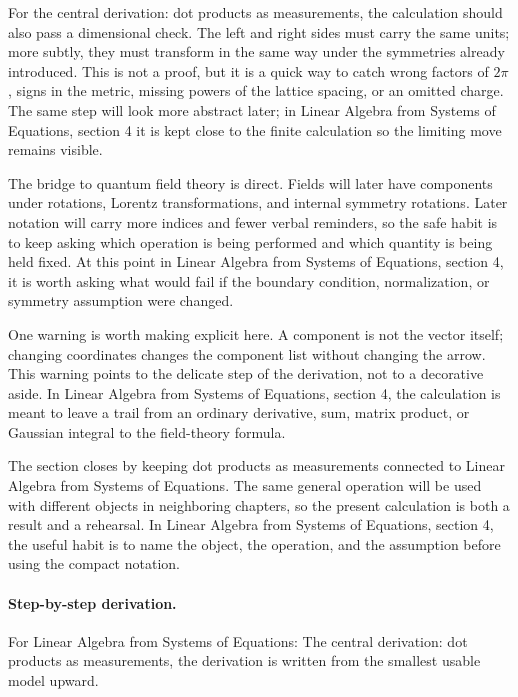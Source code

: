For the central derivation: dot products as measurements, the calculation should also pass a dimensional check.  The left and right sides must carry the same units; more subtly, they must transform in the same way under the symmetries already introduced.  This is not a proof, but it is a quick way to catch wrong factors of \(2\pi\), signs in the metric, missing powers of the lattice spacing, or an omitted charge.  The same step will look more abstract later; in Linear Algebra from Systems of Equations, section 4 it is kept close to the finite calculation so the limiting move remains visible.

The bridge to quantum field theory is direct.  Fields will later have components under rotations, Lorentz transformations, and internal symmetry rotations.  Later notation will carry more indices and fewer verbal reminders, so the safe habit is to keep asking which operation is being performed and which quantity is being held fixed.  At this point in Linear Algebra from Systems of Equations, section 4, it is worth asking what would fail if the boundary condition, normalization, or symmetry assumption were changed.

One warning is worth making explicit here.  A component is not the vector itself; changing coordinates changes the component list without changing the arrow.  This warning points to the delicate step of the derivation, not to a decorative aside.  In Linear Algebra from Systems of Equations, section 4, the calculation is meant to leave a trail from an ordinary derivative, sum, matrix product, or Gaussian integral to the field-theory formula.

The section closes by keeping dot products as measurements connected to Linear Algebra from Systems of Equations.  The same general operation will be used with different objects in neighboring chapters, so the present calculation is both a result and a rehearsal.  In Linear Algebra from Systems of Equations, section 4, the useful habit is to name the object, the operation, and the assumption before using the compact notation.



\paragraph{Step-by-step derivation.}

For Linear Algebra from Systems of Equations: The central derivation: dot products as measurements, the derivation is written from the smallest usable model upward.


